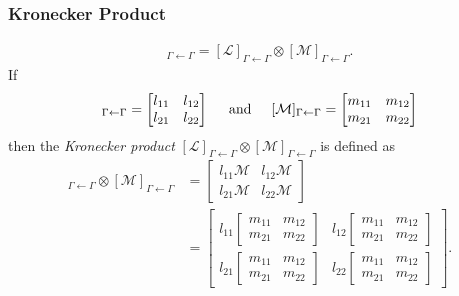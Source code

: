 \documentclass{beamer}
\theoremstyle{definition}
\newcommand{\lag}{\mathcal{L}}
\newcommand{\M}{\mathcal{M}}
\begin{document}
\begin{frame}
\frametitle{Kronecker Product}
\begin{align*}
[\lag\otimes\M]_{\Gamma\leftarrow\Gamma} = [\lag]_{\Gamma\leftarrow\Gamma}\otimes [\M]_{\Gamma\leftarrow\Gamma}.
\end{align*}
If 
\begin{align*}
[\lag]_{\Gamma\leftarrow\Gamma} = \begin{bmatrix}
l_{11} & l_{12}\\l_{21}&l_{22}
\end{bmatrix}\hspace{0.5cm}\text{and}\hspace{0.5cm}
[\M]_{\Gamma\leftarrow\Gamma} = \begin{bmatrix}
m_{11} & m_{12}\\m_{21}& m_{22}
\end{bmatrix}
\end{align*}
then the \textit{Kronecker product} $[\lag]_{\Gamma\leftarrow\Gamma} \otimes [\M]_{\Gamma\leftarrow\Gamma} $ is defined as
\begin{align*}
[\lag]_{\Gamma\leftarrow\Gamma}\otimes [\M]_{\Gamma\leftarrow\Gamma} &= \begin{bmatrix}
l_{11}\M& l_{12}\M \\ l_{21}\M& l_{22}\M 
\end{bmatrix}\\
&= \begin{bmatrix}
l_{11}\begin{bmatrix}
m_{11} & m_{12}\\m_{21}& m_{22}
\end{bmatrix}& l_{12}\begin{bmatrix}
m_{11} & m_{12}\\m_{21}& m_{22}
\end{bmatrix} \\ l_{21}\begin{bmatrix}
m_{11} & m_{12}\\m_{21}& m_{22}
\end{bmatrix}& l_{22}\begin{bmatrix}
m_{11} & m_{12}\\m_{21}& m_{22}
\end{bmatrix}
\end{bmatrix}.
\end{align*}
\end{frame}



%
%
\end{document}
